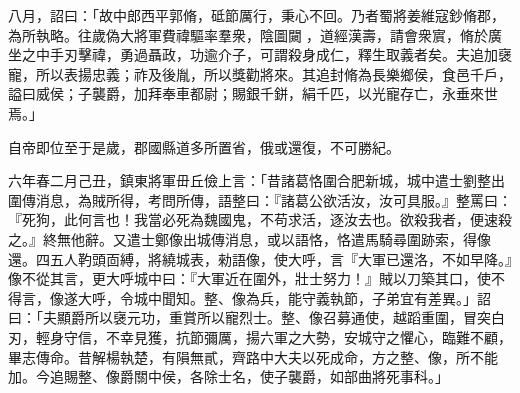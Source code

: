 \begin{pinyinscope}
 
八月，詔曰：「故中郎西平郭脩，砥節厲行，秉心不回。乃者蜀將姜維寇鈔脩郡，為所執略。往歲偽大將軍費禕驅率羣衆，陰圖闚𨵦，道經漢壽，請會衆賔，脩於廣坐之中手刃擊禕，勇過聶政，功逾介子，可謂殺身成仁，釋生取義者矣。夫追加襃寵，所以表揚忠義；祚及後胤，所以獎勸將來。其追封脩為長樂鄉侯，食邑千戶，謚曰威侯；子襲爵，加拜奉車都尉；賜銀千鉼，絹千匹，以光寵存亡，永垂來世焉。」
 
 
 
 
 自帝即位至于是歲，郡國縣道多所置省，俄或還復，不可勝紀。
 
 
 
 
 六年春二月己丑，鎮東將軍毌丘儉上言：「昔諸葛恪圍合肥新城，城中遣士劉整出圍傳消息，為賊所得，考問所傳，語整曰：『諸葛公欲活汝，汝可具服。』整罵曰：『死狗，此何言也！我當必死為魏國鬼，不苟求活，逐汝去也。欲殺我者，便速殺之。』終無他辭。又遣士鄭像出城傳消息，或以語恪，恪遣馬騎尋圍跡索，得像還。四五人靮頭靣縛，將繞城表，勑語像，使大呼，言『大軍已還洛，不如早降。』像不從其言，更大呼城中曰：『大軍近在圍外，壯士努力！』賊以刀築其口，使不得言，像遂大呼，令城中聞知。整、像為兵，能守義執節，子弟宜有差異。」詔曰：「夫顯爵所以襃元功，重賞所以寵烈士。整、像召募通使，越蹈重圍，冒突白刃，輕身守信，不幸見獲，抗節彌厲，揚六軍之大勢，安城守之懼心，臨難不顧，畢志傳命。昔解楊執楚，有隕無貳，齊路中大夫以死成命，方之整、像，所不能加。今追賜整、像爵關中侯，各除士名，使子襲爵，如部曲將死事科。」
 

\end{pinyinscope}
